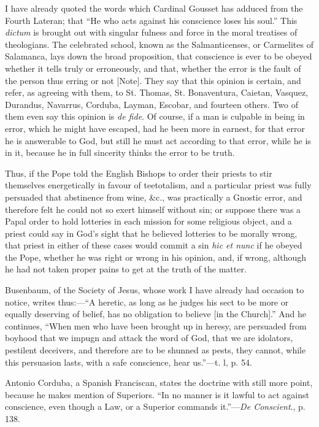 I have already quoted the words which Cardinal Gousset has adduced
from the Fourth Lateran; that ``He who acts against his conscience
loses his soul.'' This \emph{dictum} is brought out with singular
fulness and force in the moral treatises of theologians. The celebrated
school, known as the Salmanticenses, or Carmelites of Salamanca, lays
down the broad proposition, that conscience is ever to be obeyed whether
it tells truly or erroneously, and that, whether the error is the fault
of the person thus erring or not [Note].
They say that this opinion is certain, and refer, as agreeing with them,
to St. Thomas, St. Bonaventura, Caietan, Vasquez, Durandus, Navarrus,
Corduba, Layman, Escobar, and fourteen others. Two of them even say this
opinion is \emph{de fide}. Of course, if a man is culpable in being in
error, which he might have escaped, had he been more in earnest, for
that error he is answerable to God, but still he must act according to
that error, while he is in it, because he in full sincerity thinks the
error to be truth.

Thus, if the Pope told the English Bishops to order their priests to
stir themselves energetically in favour of teetotalism, and a particular
priest was fully persuaded that abstinence from wine, \&c., was
practically a Gnostic error, and therefore felt he could not so exert
himself without sin; or suppose there was a Papal order to hold
lotteries in each mission for some religious object, and a priest could
say in God's sight that he believed lotteries to be morally wrong, that
priest in either of these cases would commit a sin \emph{hic et nunc} if
he obeyed the Pope, whether he was right or wrong in his opinion, and,
if wrong, although he had not taken proper pains to get at the truth of
the matter.

Busenbaum, of the Society of Jesus, whose work I have already had
occasion to notice, writes thus:—``A heretic, as long as he judges
his sect to be more or equally deserving of belief, has no obligation to
believe [in the Church].'' And he continues, ``When men who have
been brought up in heresy, are persuaded from boyhood that we impugn and
attack the word of God, that we are idolators, pestilent deceivers, and
therefore are to be shunned as pests, they cannot, while this persuasion
lasts, with a safe conscience, hear us.''—t. l, p. 54.

Antonio Corduba, a Spanish Franciscan, states the doctrine with still
more point, because he makes mention of Superiors. ``In no manner is
it lawful to act against conscience, even though a Law, or a Superior
commands it.''—\emph{De Conscient}., p. 138.


